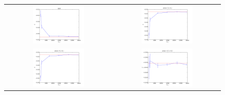 \documentclass[a4paper, 12pt]{revtex4}
\begin{document}
\begin{figure}[m]
\begin{tabular}{cc}
\includegraphics[width=0.5\textwidth,clip]{shift.pdf}  & \includegraphics[width=0.5\textwidth,clip]{proje1.pdf} \\
\includegraphics[width=0.5\textwidth,clip]{proje2.pdf} & \includegraphics[width=0.5\textwidth,clip]{proje3.pdf} \\
\end{tabular}
\end{figure}
\end{document}
